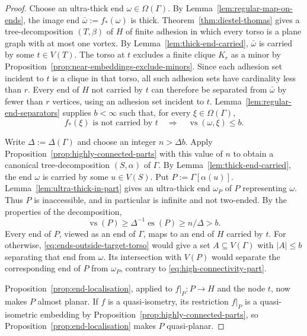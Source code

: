 \documentclass[a4paper]{amsart}
\begin{document}
\begin{proof}
Choose an ultra-thick end $\omega\in\Omega(\Gamma)$.
By Lemma~\ref{lem:regular-map-on-ends}, the image end $\bar\omega:=f_*(\omega)$ is thick.
Theorem~\ref{thm:diestel-thomas} gives a tree-decomposition $(T,\beta)$ of $H$ of finite adhesion in which every torso is a plane graph with at most one vortex.
By Lemma~\ref{lem:thick-end-carried}, $\bar\omega$ is carried by some $t\in V(T)$.
The torso at $t$ excludes a finite clique $K_r$ as a minor by Proposition~\ref{prop:near-embeddings-exclude-minors}.
Since each adhesion set incident to $t$ is a clique in that torso, all such adhesion sets have cardinality less than $r$.
Every end of $H$ not carried by $t$ can therefore be separated from $\bar\omega$ by fewer than $r$ vertices, using an adhesion set incident to $t$.
Lemma~\ref{lem:regular-end-separators} supplies $b<\infty$ such that, for every $\xi\in\Omega(\Gamma)$,
\begin{equation}\label{eq:ends-outside-target-torso}
f_*(\xi)\text{ is not carried by }t\quad\Longrightarrow\quad\operatorname{vs}(\omega,\xi)\leq b.
\end{equation}


Write $\Delta:=\Delta(\Gamma)$ and choose an integer $n>\Delta b$.
Apply Proposition~\ref{prop:highly-connected-parts} with this value of $n$ to obtain a canonical tree-decomposition $(S,\alpha)$ of $\Gamma$.
By Lemma~\ref{lem:thick-end-carried}, the end $\omega$ is carried by some $u\in V(S)$.
Put $P:=\Gamma[\alpha(u)]$.
Lemma~\ref{lem:ultra-thick-in-part} gives an ultra-thick end $\omega_P$ of $P$ representing $\omega$.
Thus $P$ is inaccessible, and in particular is infinite and not two-ended.
By the properties of the decomposition,
\begin{equation}\label{eq:high-connectivity-part}
\operatorname{vs}(P)\geq\Delta^{-1}\operatorname{es}(P)\geq n/\Delta>b.
\end{equation}
Every end of $P$, viewed as an end of $\Gamma$, maps to an end of $H$ carried by $t$.
For otherwise, \eqref{eq:ends-outside-target-torso} would give a set $A\subseteq V(\Gamma)$ with $|A|\leq b$ separating that end from $\omega$.
Its intersection with $V(P)$ would separate the corresponding end of $P$ from $\omega_P$, contrary to \eqref{eq:high-connectivity-part}.

Proposition~\ref{prop:end-localisation}, applied to $f|_P:P\to H$ and the node $t$, now makes $P$ almost planar.
If $f$ is a quasi-isometry, its restriction $f|_P$ is a quasi-isometric embedding by Proposition~\ref{prop:highly-connected-parts}, so Proposition~\ref{prop:end-localisation} makes $P$ quasi-planar.
\end{proof}
\end{document}

